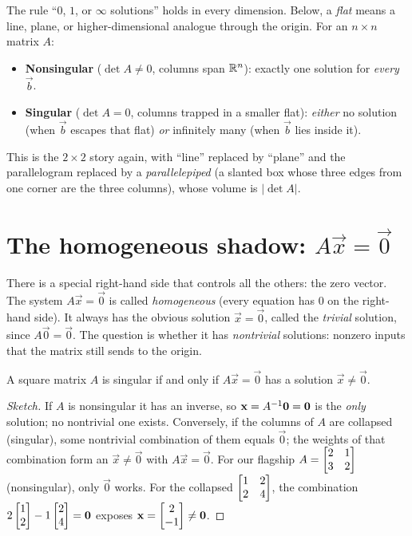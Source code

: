 \begin{focusbox}
The rule ``$0$, $1$, or $\infty$ solutions'' holds in every dimension. Below, a
\emph{flat} means a line, plane, or higher-dimensional analogue through the
origin. For an $n\times n$ matrix $A$:
\begin{itemize}
  \item \textbf{Nonsingular} ($\det A\neq0$, columns span $\mathbb{R}^n$): exactly
  one solution for \emph{every} $\vec b$.
  \item \textbf{Singular} ($\det A=0$, columns trapped in a smaller flat):
  \emph{either} no solution (when $\vec b$ escapes that flat) \emph{or}
  infinitely many (when $\vec b$ lies inside it).
\end{itemize}
This is the $2\times2$ story again, with ``line'' replaced by ``plane'' and
the parallelogram replaced by a \emph{parallelepiped} (a slanted box whose
three edges from one corner are the three columns), whose volume is
$\lvert\det A\rvert$.
\end{focusbox}

\section{The homogeneous shadow: $A\vec x=\vec 0$}

There is a special right-hand side that controls all the others: the zero
vector. The system $A\vec x=\vec 0$ is called \emph{homogeneous} (every
equation has $0$ on the right-hand side). It always has the obvious
solution $\vec x=\vec 0$, called the \emph{trivial} solution, since
$A\vec 0=\vec 0$. The question is whether it has \emph{nontrivial}
solutions: nonzero inputs that the matrix still sends to the origin.

\begin{theorem}[Singular $\Leftrightarrow$ nonzero solutions to $A\vec x=\vec 0$]
\label{ch06:homog}
A square matrix $A$ is singular if and only if $A\vec x=\vec 0$ has a
solution $\vec x\neq\vec 0$.
\end{theorem}

\begin{proof}[Sketch]
If $A$ is nonsingular it has an inverse, so $\mathbf{x}=A^{-1}\mathbf{0}=\mathbf{0}$ is
the \emph{only} solution; no nontrivial one exists. Conversely, if the
columns of $A$ are collapsed (singular), some nontrivial combination of them
equals $\vec 0$; the weights of that combination form an $\vec x\neq\vec0$
with $A\vec x=\vec0$. For our flagship $A=\begin{bmatrix}2&1\\3&2\end{bmatrix}$ (nonsingular),
only $\vec0$ works. For the collapsed $\begin{bmatrix}1&2\\2&4\end{bmatrix}$, the combination
$2\begin{bmatrix}1\\2\end{bmatrix}-1\begin{bmatrix}2\\4\end{bmatrix}=\mathbf{0}$ exposes $\mathbf{x}=\begin{bmatrix}2\\-1\end{bmatrix}\neq\mathbf{0}$.
\end{proof}


